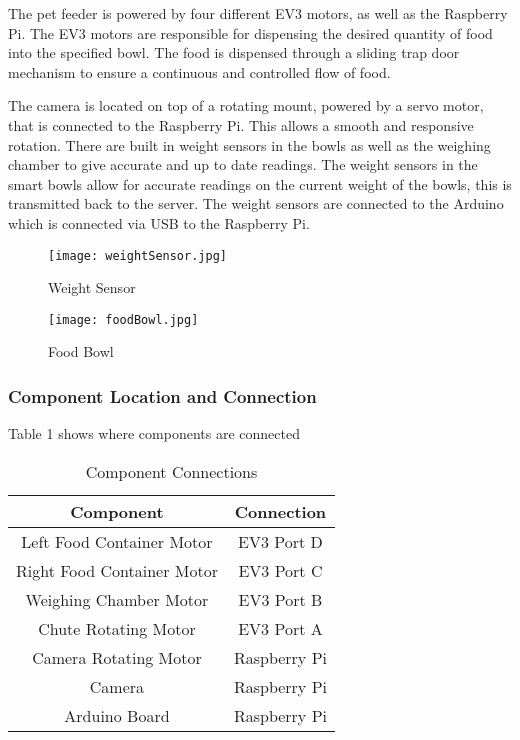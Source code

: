         The pet feeder is powered by four different EV3 motors, as well as the Raspberry Pi. The EV3 motors are responsible for dispensing the desired quantity of food into the specified bowl. The food is dispensed through a sliding trap door mechanism to ensure a continuous and controlled flow of food. 
        
        The camera is located on top of a rotating mount, powered by a servo motor, that is connected to the Raspberry Pi. This allows a smooth and responsive rotation. There are built in weight sensors in the bowls as well as the weighing chamber to give accurate and up to date readings. The weight sensors in the smart bowls allow for accurate readings on the current weight of the bowls, this is transmitted back to the server. The weight sensors are connected to the Arduino which is connected via USB to the Raspberry Pi.
        
        \begin{figure}[h]
        \centering
        \texttt{[image: weightSensor.jpg]}
         \caption{Weight Sensor}
        \end{figure}
        
         \begin{figure}[h]
        \centering
        \texttt{[image: foodBowl.jpg]}
         \caption{Food Bowl}
        \end{figure}
        

        \subsubsection{Component Location and Connection}
        Table 1 shows where components are connected
        
        \begin{table}[h!]
            \centering
             \begin{tabular}{||c | c||} 
             \hline \hline
             Component & Connection \\ [0.5ex] 
             \hline\hline
             Left Food Container Motor & EV3 Port D  \\ [1ex] \hline 
             Right Food Container Motor & EV3 Port C  \\ [1ex] \hline 
             Weighing Chamber Motor & EV3 Port B \\ [1ex] \hline 
             Chute Rotating Motor & EV3 Port A  \\ [1ex]  \hline 
             Camera Rotating Motor & Raspberry Pi  \\ [1ex] \hline 
             Camera & Raspberry Pi \\ [1ex] \hline 
             Arduino Board & Raspberry Pi \\ [1ex] \hline 
             \hline 
             \end{tabular}
             \caption{Component Connections}
        \end{table}
        
